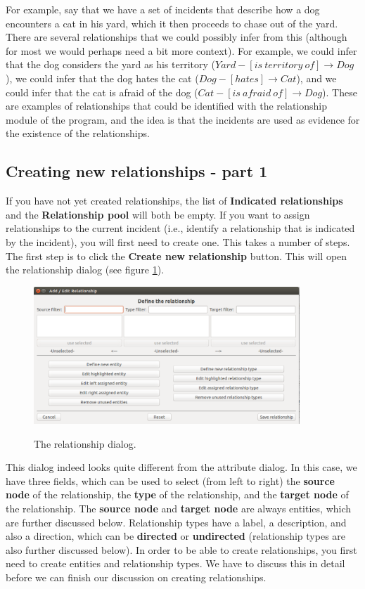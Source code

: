 \documentclass{memoir}
\begin{document}
For example, say that we have a set of incidents that describe how a dog encounters a cat in his yard, which it then proceeds to chase out of the yard. There are several relationships that we could possibly infer from this (although for most we would perhaps need a bit more context). For example, we could infer that the dog considers the yard as his territory (\(Yard-[is\  territory\ of]\rightarrow Dog\)), we could infer that the dog hates the cat (\(Dog-[hates]\rightarrow Cat\)), and we could infer that the cat is afraid of the dog (\(Cat-[is\ afraid\ of]\rightarrow Dog\)). These are examples of relationships that could be identified with the relationship module of the program, and the idea is that the incidents are used as evidence for the existence of the relationships.

\subsection{Creating new relationships - part 1}
\label{sec:creatingnewrelationships1}

If you have not yet created relationships, the list of \textbf{Indicated relationships} and the \textbf{Relationship pool} will both be empty. If you want to assign relationships to the current incident (i.e., identify a relationship that is indicated by the incident), you will first need to create one. This takes a number of steps. The first step is to click the \textbf{Create new relationship} button. This will open the relationship dialog (see figure \ref{fig:relationshipdialog}).

\begin{figure}[h!]
  \centering
  \caption{The relationship dialog.}
  \includegraphics[width=100mm]{Screenshot_15.pdf}
  \label{fig:relationshipdialog}
\end{figure}

This dialog indeed looks quite different from the attribute dialog. In this case, we have three fields, which can be used to select (from left to right) the \textbf{source node} of the relationship, the \textbf{type} of the relationship, and the \textbf{target node} of the relationship. The \textbf{source node} and \textbf{target node} are always entities, which are further discussed below. Relationship types have a label, a description, and also a direction, which can be \textbf{directed} or \textbf{undirected} (relationship types are also further discussed below). In order to be able to create relationships, you first need to create entities and relationship types. We have to discuss this in detail before we can finish our discussion on creating relationships.
\end{document}

